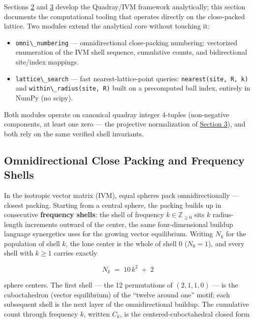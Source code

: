 \documentclass[
  10pt,
]{article}
\newcommand{\passthrough}[1]{#1}
\providecommand{\tightlist}{%
  \setlength{\itemsep}{0pt}\setlength{\parskip}{0pt}}
\begin{document}
Sections \href{02_4d_namespaces.md}{2} and
\href{03_quadray_methods.md}{3} develop the Quadray/IVM framework
analytically; this section documents the computational tooling that
operates directly on the close-packed lattice. Two modules extend the
analytical core without touching it:

\begin{itemize}
\tightlist
\item
  \passthrough{\lstinline!omni\_numbering!} --- omnidirectional
  close-packing numbering: vectorized enumeration of the IVM shell
  sequence, cumulative counts, and bidirectional site/index mappings.
\item
  \passthrough{\lstinline!lattice\_search!} --- fast
  nearest-lattice-point queries:
  \passthrough{\lstinline!nearest(site, R, k)!} and
  \passthrough{\lstinline!within\_radius(site, R)!} built on a
  precomputed ball index, entirely in NumPy (no scipy).
\end{itemize}

Both modules operate on canonical quadray integer 4-tuples (non-negative
components, at least one zero --- the projective normalization of
\href{03_quadray_methods.md}{Section 3}), and both rely on the same
verified shell invariants.

\subsection{Omnidirectional Close Packing and Frequency
Shells}\label{omnidirectional-close-packing-and-frequency-shells}

In the isotropic vector matrix (IVM), equal spheres pack
omnidirectionally --- closest packing. Starting from a central sphere,
the packing builds up in consecutive \textbf{frequency shells}: the
shell of frequency \(k \in \mathbb{Z}_{\ge 0}\) sits \(k\) radius-length
increments outward of the center, the same four-dimensional buildup
language synergetics uses for the growing vector equilibrium. Writing
\(N_k\) for the population of shell \(k\), the lone center is the whole
of shell 0 (\(N_0 = 1\)), and every shell with \(k \ge 1\) carries
exactly

\begin{equation}\label{eq:lattice-shell-population}
N_k \;=\; 10\,k^{2} \;+\; 2
\end{equation}

sphere centers. The first shell --- the 12 permutations of
\((2, 1, 1, 0)\) --- is the cuboctahedron (vector equilibrium) of the
``twelve around one'' motif; each subsequent shell is the next layer of
the omnidirectional buildup. The cumulative count through frequency
\(k\), written \(C_k\), is the centered-cuboctahedral closed form
\end{document}
